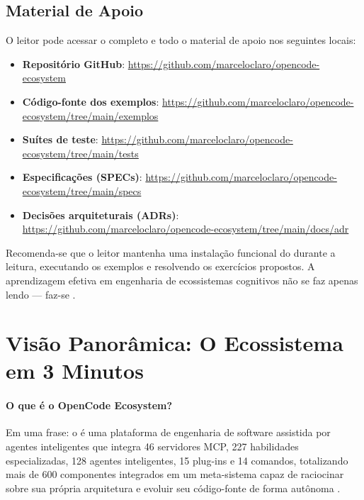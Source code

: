 \subsection{Material de Apoio}

O leitor pode acessar o \opencodeeco{} completo e todo o material de apoio
nos seguintes locais:

\begin{itemize}
  \item \textbf{Repositório GitHub}:
        \url{https://github.com/marceloclaro/opencode-ecosystem}
  \item \textbf{Código-fonte dos exemplos}:
        \url{https://github.com/marceloclaro/opencode-ecosystem/tree/main/exemplos}
  \item \textbf{Suítes de teste}:
        \url{https://github.com/marceloclaro/opencode-ecosystem/tree/main/tests}
  \item \textbf{Especificações (SPECs)}:
        \url{https://github.com/marceloclaro/opencode-ecosystem/tree/main/specs}
  \item \textbf{Decisões arquiteturais (ADRs)}:
        \url{https://github.com/marceloclaro/opencode-ecosystem/tree/main/docs/adr}
\end{itemize}

Recomenda-se que o leitor mantenha uma instalação funcional do
\opencodeeco{} durante a leitura, executando os exemplos e resolvendo os
exercícios propostos. A aprendizagem efetiva em engenharia de ecossistemas
cognitivos não se faz apenas lendo --- faz-se .

\section{Visão Panorâmica: O Ecossistema em 3 Minutos}

\paragraph*{O que é o OpenCode Ecosystem?} Em uma frase: o \opencodeeco{}
é uma plataforma de engenharia de software assistida por agentes
inteligentes que integra 46 servidores MCP, 227 habilidades especializadas,
128 agentes inteligentes, 15 plug-ins e 14 comandos, totalizando mais de
600 componentes integrados em um meta-sistema capaz de raciocinar sobre sua
própria arquitetura e evoluir seu código-fonte de forma autônoma
\cite{opencode2026ecosystem}.

